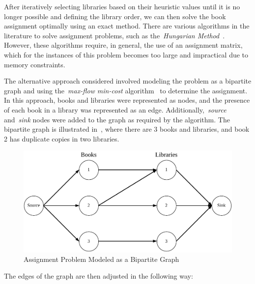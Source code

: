 After iteratively selecting libraries based on their heuristic values until it is
no longer possible and defining the library order, we can then solve the book
assignment optimally using an exact method. There are various algorithms in the
literature to solve assignment problems, such as the~\emph{Hungarian
  Method}~\cite{ramshaw2012minimumcost}. However, these algorithms require, in
general, the use of an assignment matrix, which for the instances of this
problem becomes too large and impractical due to memory constraints.

The alternative approach considered involved modeling the problem as a bipartite
graph and using the~\emph{max-flow min-cost} algorithm~\cite{ramshaw2012minimumcost}
to determine the assignment. In this approach, books and libraries were
represented as nodes, and the presence of each book in a library was represented
as an edge. Additionally,~\emph{source} and~\emph{sink} nodes were added to the
graph as required by the algorithm. The bipartite graph is illustrated
in~, where there are 3 books and libraries, and book 2 has
duplicate copies in two libraries.

\begin{figure}[h]
  \centering
  \includegraphics[width=\textwidth,keepaspectratio]{../assets/bs/bs-graph.pdf}
  \caption{Assignment Problem Modeled as a Bipartite Graph}
  \label{fig:bs-graph}
\end{figure}

The edges of the graph are then adjusted in the following way:

